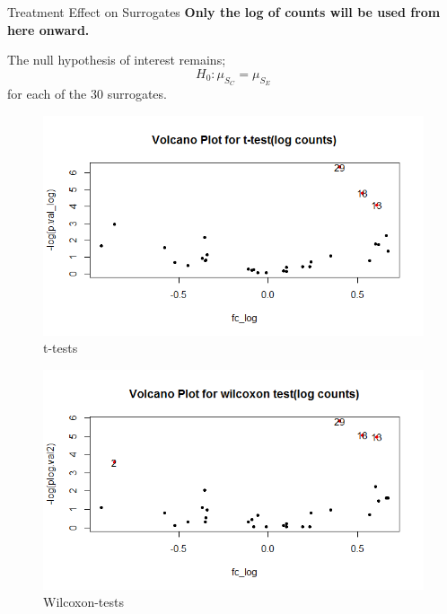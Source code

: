 \documentclass[a4paper,9pt]{beamer}\usepackage[]{graphicx}\usepackage[]{color}
\begin{document}
\begin{frame}{Treatment Effect on Surrogates}
\alert{\textbf{Only the log of counts will be used from here onward.}}

The null hypothesis of interest remains; $$H_0: \mu_{S_C} = \mu_{S_E}$$ for each of the 30 surrogates.

\begin{minipage}{0.3\textwidth}
\begin{figure}[H]
\includegraphics[scale=0.3]{t-testvolcano_plot_logcounts.png}
\caption{t-tests}
\end{figure}
\end{minipage}
\hfill
\begin{minipage}{0.5\textwidth}
\begin{figure}[H]
\includegraphics[scale=0.35]{wilcox_volcano_plot_logcounts.png}
\caption{Wilcoxon-tests}
\end{figure}

\end{minipage}
\end{frame}
\end{document}
